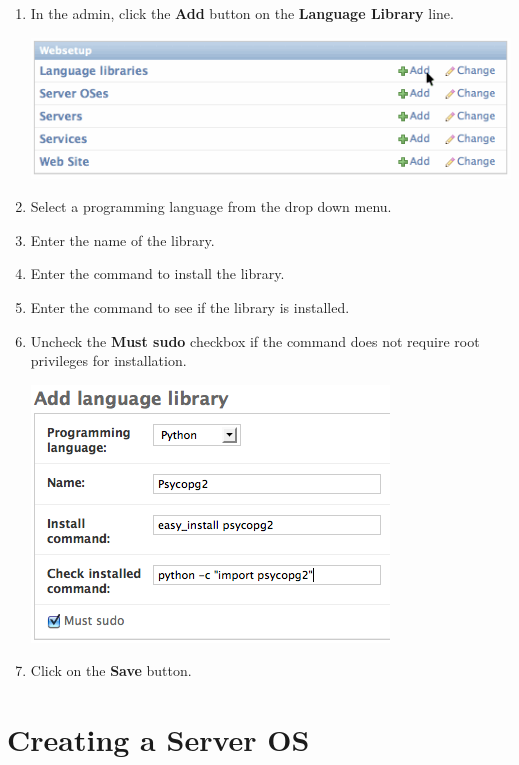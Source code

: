 \documentclass[letterpaper,10pt,english]{manual}
\begin{document}
\begin{enumerate}
\item {} 
In the admin, click the \textbf{Add} button on the \textbf{Language Library} line.

\includegraphics{add_languagelibrary.png}

\item {} 
Select a programming language from the drop down menu.

\item {} 
Enter the name of the library.

\item {} 
Enter the command to install the library.

\item {} 
Enter the command to see if the library is installed.

\item {} 
Uncheck the \textbf{Must sudo} checkbox if the command does not require root privileges for installation.

\includegraphics{add_languagelibrary_form.png}

\item {} 
Click on the \textbf{Save} button.

\end{enumerate}

\resetcurrentobjects
\hypertarget{--doc-gettingstarted/creating_serveros}{}

\hypertarget{gettingstarted-creating-serveros}{}\section{Creating a Server OS}
\end{document}

